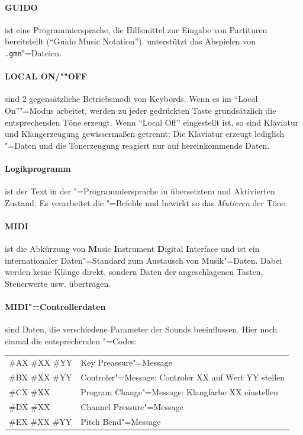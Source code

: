 \paragraph{GUIDO}\label{sec:DV_GUIDO} ist eine
  Programmiersprache, die Hilfsmittel zur Eingabe von Partituren
  bereitstellt ("`Guido Music Notation"'). \mutabor{} unterstützt das
  Abspielen von \texttt{.gmn}"=Dateien.

\paragraph{LOCAL ON/""OFF}\label{sec:DV_LOCAL} sind 2
  gegensätzliche Betriebsmodi von Keybords. Wenn es im "`Local
  On"'"=Modus arbeitet, werden zu jeder gedrückten Taste grundsätzlich
  die entsprechenden Töne erzeugt. Wenn "`Local Off"' eingestellt ist,
  so sind Klaviatur und Klangerzeugung gewissermaßen getrennt: Die
  Klaviatur erzeugt lediglich "=Daten und
  die Tonerzeugung reagiert nur auf hereinkommende Daten.

\paragraph{Logikprogramm}\label{sec:DV_LOGIKPROGRAMM} ist der
  Text in der \mutabor{}"=Programmiersprache in übersetztem und
  Aktivierten Zustand. Es verarbeitet die
  "=Befehle und bewirkt so das
  \emph{Mutieren} der Töne.

\paragraph{MIDI}\label{sec:DV_MIDI} ist die Abkürzung von
  \textbf{M}usic \textbf{I}nstrument \textbf{D}igital
  \textbf{I}nterface und ist ein internationaler Daten"=Standard zum
  Austausch von Musik"=Daten. Dabei werden keine Klänge direkt,
  sondern Daten der angeschlagenen Tasten, Steuerwerte usw.
  übertragen.

\paragraph{MIDI"=Controllerdaten}\label{sec:DV_MIDICON} sind
  Daten, die verschiedene Parameter der Sounds beeinflussen.  Hier noch
  einmal die entsprechenden "=Codes:

  \begin{tabular}{l@{ \dots }l}
    \#AX \#XX \#YY&Key Preassure"=Message\\
    \#BX \#XX \#YY&Controler"=Message: Controler XX auf Wert YY stellen\\
    \#CX \#XX&Program Change"=Message: Klangfarbe XX einstellen\\
    \#DX \#XX&Channel Pressure"=Message\\
    \#EX \#XX \#YY&Pitch Bend"=Message
  \end{tabular}

